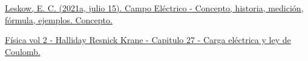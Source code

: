 \begin{thebibliography}{99}

  \href{https://concepto.de/campo-electrico/}{ Leskow, E. C. (2021a, julio 15). Campo Eléctrico - Concepto, historia, medición, fórmula, ejemplos. Concepto.}

  \href{https://www.docsity.com/es/fisica-vol-2-halliday-resnick-krane-capitulo-27-carga-electrica-y-ley-de-coulomb/8247802/}{Física vol 2 - Halliday Resnick Krane - Capitulo 27 - Carga eléctrica y ley de Coulomb.}
  
\end{thebibliography}
  